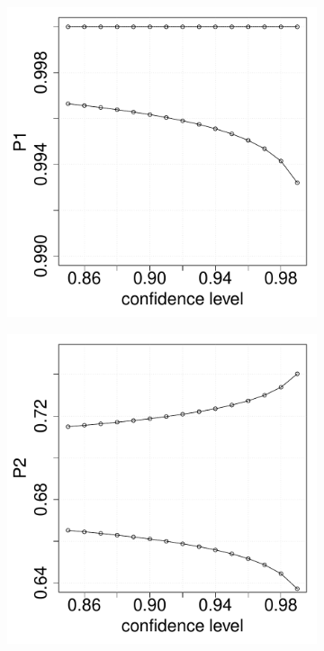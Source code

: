 \documentclass{article}
\begin{document}
\begin{figure}
	\centering
	\begin{subfigure}{0.4\textwidth}
		\includegraphics[width=\linewidth]{images/temp.pdf}
	\end{subfigure}
	\begin{subfigure}{0.4\textwidth}
		\includegraphics[width=\linewidth]{images/P2-WebApplication.pdf}

\end{subfigure}
\end{figure}
\end{document}
